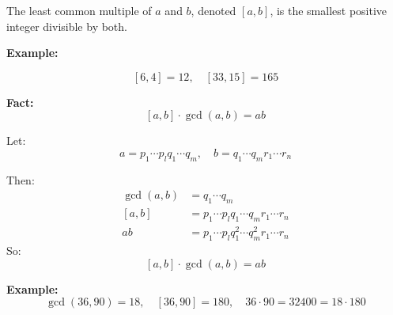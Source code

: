 The least common multiple of \(a\) and \(b\), denoted \([a, b]\), is the smallest positive integer divisible by both.
\vspace{\baselineskip}

\textbf{Example:}
\vspace{\baselineskip}

\[
	[6, 4] = 12, \quad [33, 15] = 165
\]

\textbf{Fact:}
\[
	[a, b] \cdot \gcd(a, b) = ab
\]

Let:
\[
	a = p_1 \cdots p_lq_1 \cdots q_m, \quad b = q_1 \cdots q_mr_1 \cdots r_n
\]

Then:
\begin{align*}
	\gcd(a, b) & = q_1 \cdots q_m                                 \\
	[a, b]     & = p_1 \cdots p_lq_1 \cdots q_mr_1 \cdots r_n     \\
	ab         & = p_1 \cdots p_lq_1^2 \cdots q_m^2r_1 \cdots r_n
\end{align*}
So:
\[
	[a, b] \cdot \gcd(a, b) = ab
\]

\textbf{Example:}
\[
	\gcd(36, 90) = 18, \quad [36, 90] = 180, \quad 36 \cdot 90 = 32400 = 18 \cdot 180
\]

